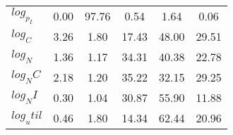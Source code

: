 \begin{center}
\begin{longtable}{lccccc}
$log_p_I   $	 & 	        0.00	 & 	       97.76	 & 	        0.54	 & 	        1.64	 & 	        0.06 \\ 
$log_C     $	 & 	        3.26	 & 	        1.80	 & 	       17.43	 & 	       48.00	 & 	       29.51 \\ 
$log_N     $	 & 	        1.36	 & 	        1.17	 & 	       34.31	 & 	       40.38	 & 	       22.78 \\ 
$log_NC    $	 & 	        2.18	 & 	        1.20	 & 	       35.22	 & 	       32.15	 & 	       29.25 \\ 
$log_NI    $	 & 	        0.30	 & 	        1.04	 & 	       30.87	 & 	       55.90	 & 	       11.88 \\ 
$log_util  $	 & 	        0.46	 & 	        1.80	 & 	       14.34	 & 	       62.44	 & 	       20.96 \\ 
\end{longtable}
 \end{center}

